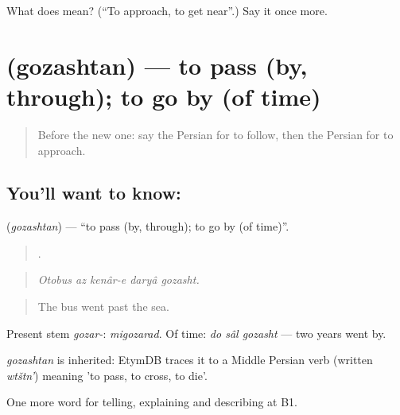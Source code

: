 \begin{tcolorbox}[breakable,colback=teal!4,colframe=teal!35!black,title={Before you move on}]
What does   mean? (\textquotedblleft{}To approach, to get near\textquotedblright{}.) Say it once more.
\end{tcolorbox}
\section[\texorpdfstring{\fa{گذشتن} (gozashtan)}{گذشتن (gozashtan)}]{ (gozashtan) — to pass (by, through); to go by (of time)}

\label{lesson:FA-C449-gozashtan}



\begin{quote}
Before the new one: say the Persian for to follow, then the Persian for to approach.
\end{quote}

\subsection*{You'll want to know: }
\textbf{} (\emph{gozashtan}) — \textquotedblleft{}to pass (by, through); to go by (of time)\textquotedblright{}.

\begin{quote}
    .
\end{quote}

\begin{quote}
\emph{Otobus az kenâr-e daryâ gozasht.}
\end{quote}

\begin{quote}
The bus went past the sea.
\end{quote}

Present stem \emph{gozar-}: \emph{migozarad}. Of time: \emph{do sâl gozasht} — two years went by.

\begin{cousinweb}
\emph{gozashtan} is inherited: EtymDB traces it to a Middle Persian verb (written \emph{wtštn'}) meaning 'to pass, to cross, to die'.
\end{cousinweb}

\begin{grammarlens}[title={What you've built}]
One more word for telling, explaining and describing at B1.
\end{grammarlens}

